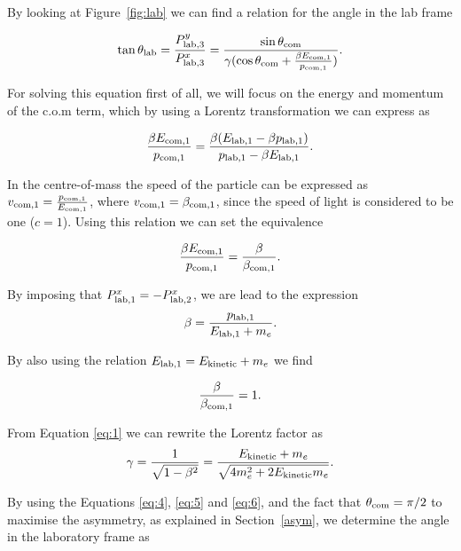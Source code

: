 \documentclass[10pt,swedish, openany]{book}
\begin{document}
By looking at Figure~\ref{fig:lab} we can find a relation for the angle in the lab frame

\begin{equation}\label{eq:2}
    \tan{\theta_{\rm lab}} = \frac{P^y_{\rm lab,3}}{P^x_{\rm lab,3}} = \frac{\sin{\theta_{\rm com}}}{\gamma(\cos{\theta_{\rm com}}+\frac{\beta E_{\rm com,1}}{p_{\rm com,1}})}.
\end{equation}

For solving this equation first of all, we will focus on the energy and momentum of the c.o.m term, which by using a Lorentz transformation we can express as

\begin{equation}\label{eq:3}
    \frac{\beta E_{\rm com,1}}{p_{\rm com,1}} = \frac{\beta (E_{\rm lab,1}-\beta p_{\rm lab,1})}{p_{\rm lab,1}-\beta E_{\rm lab,1}}.
\end{equation}

In the centre-of-mass the speed of the particle can be expressed as $v_{\rm com,1} = \frac{p_{\rm com,1}}{E_{\rm com,1}}$, where $v_{\rm com,1} = \beta_{\rm com,1}$, since the speed of light is considered to be one ($c=1$). Using this relation we can set the equivalence

\begin{equation}\label{eq:4}
    \frac{\beta E_{\rm com,1}}{p_{\rm com,1}} = \frac{\beta}{\beta_{\rm com,1}}.
\end{equation}

By imposing that $P^x_{\rm lab,1}=-P^x_{\rm lab,2}$, we are lead to the expression
\begin{equation}\label{eq:1}
    \beta = \frac{p_{\rm lab,1}}{E_{\rm lab,1}+m_e}.
\end{equation}

By also using the relation $E_{\rm lab,1}=E_{\rm kinetic}+m_e$ we find 

\begin{equation}\label{eq:5}
    \frac{\beta}{\beta_{\rm com,1}} = 1.
\end{equation}

From Equation \ref{eq:1} we can rewrite the Lorentz factor as
\begin{equation}\label{eq:6}
    \gamma = \frac{1}{\sqrt{1-\beta^2}}= \frac{E_{\rm kinetic}+m_e}{\sqrt{4m_e^2 + 2 E_{\rm kinetic}m_e}}.
\end{equation}

By using the Equations \ref{eq:4}, \ref{eq:5} and \ref{eq:6}, and the fact that $\theta_{\rm com} = \pi/2$ to maximise the asymmetry, as explained in Section~\ref{asym}, we determine the angle in the laboratory frame as
\end{document}
